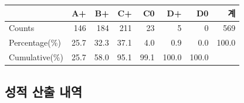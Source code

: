 \documentclass[
]{article}
\newcounter{none} %
\begin{document}
{\def\LTcaptype{none} %
\begin{longtable}[]{@{}lrrrrrrr@{}}
\toprule\noalign{}
& A+ & B+ & C+ & C0 & D+ & D0 & 계 \\
\midrule\noalign{}
\endhead
\bottomrule\noalign{}
\endlastfoot
Counts & 146 & 184 & 211 & 23 & 5 & 0 & 569 \\
Percentage(\%) & 25.7 & 32.3 & 37.1 & 4.0 & 0.9 & 0.0 & 100.0 \\
Cumulative(\%) & 25.7 & 58.0 & 95.1 & 99.1 & 100.0 & 100.0 & \\
\end{longtable}
}

\newpage

\subsection{성적 산출
내역}\label{uxc131uxc801-uxc0b0uxcd9c-uxb0b4uxc5ed}
\end{document}
